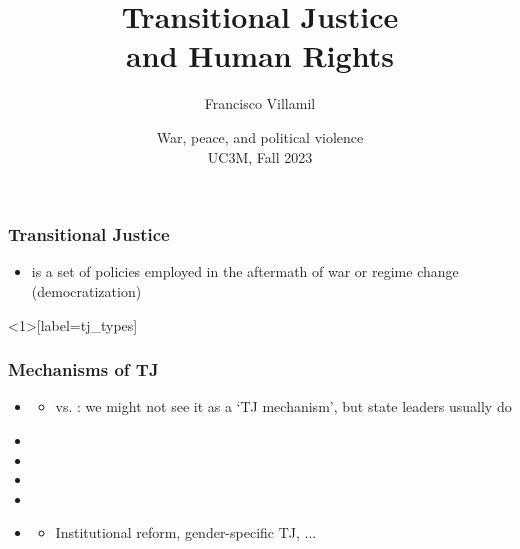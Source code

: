 \documentclass[aspectratio=43]{beamer}
\title{\huge Transitional Justice\\\vspace{5pt}and Human Rights}
\author{Francisco Villamil}
\date{War, peace, and political violence\\UC3M, Fall 2023}
\begin{document}
\begin{frame}
  \titlepage
\end{frame}


\begin{frame}
\frametitle{Transitional Justice}
\centering

\begin{itemize}
  \item {} is a set of policies employed in the aftermath of war or regime change (democratization)
\end{itemize}

\end{frame}

\begin{frame}<1>[label=tj_types]
\frametitle{Mechanisms of TJ}
\centering

\begin{itemize}
  \item {}
  \begin{itemize}
    \item<2-> vs. : we might not see it as a `TJ mechanism', but state leaders usually do
  \end{itemize}
  \item<3-> 
  \item<4-> 
  \item<5-> 
  \item<6-> 
  \item<7-> 
  \begin{itemize}
    \item Institutional reform, gender-specific TJ, ...
  \end{itemize}
\end{itemize}

\end{frame}

\end{document}
